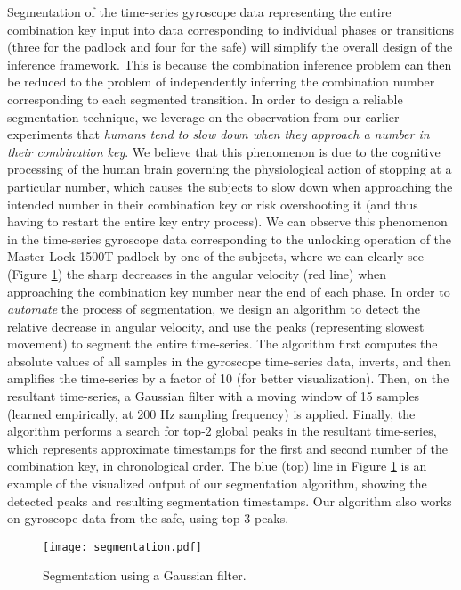 \documentclass[]{IEEEtran}
\begin{document}
Segmentation of the time-series gyroscope data representing the entire combination key input into data corresponding to individual phases or transitions (three for the padlock and four for the safe) will simplify the overall design of the inference framework. This is because the combination inference problem can then be reduced to the problem of independently inferring the combination number corresponding to each segmented transition. In order to design a reliable segmentation technique, we leverage on the observation from our earlier experiments that \textit{humans tend to slow down when they approach a number in their combination key}. We believe that this phenomenon is due to the cognitive processing of the human brain governing the physiological action of stopping at a particular number, which causes the subjects to slow down when approaching the intended number in their combination key or risk overshooting it (and thus having to restart the entire key entry process). We can observe this phenomenon in the time-series gyroscope data corresponding to the unlocking operation of the Master Lock 1500T padlock by one of the subjects, where we can clearly see (Figure \ref{splitting}) the sharp decreases in the angular velocity (red line) when approaching the combination key number near the end of each phase.
In order to \emph{automate} the process of segmentation, we design an algorithm to detect the relative decrease in angular velocity, and use the peaks (representing slowest movement) to segment the entire time-series. The algorithm first computes the absolute values of all samples in the gyroscope time-series data, inverts, and then amplifies the time-series by a factor of 10 (for better visualization). Then, on the resultant time-series, a Gaussian filter with a moving window \cite{deisenroth2011general} of 15 samples (learned empirically, at 200 Hz sampling frequency) is applied. Finally, the algorithm  performs a search for top-$2$ global peaks in the resultant time-series, which represents approximate timestamps for the first and second number of the combination key, in chronological order. The blue (top) line in Figure \ref{splitting} is an example of the visualized output of our segmentation algorithm, showing the detected peaks and resulting segmentation timestamps. Our algorithm also works on gyroscope data from the safe, using top-$3$ peaks.

\begin{figure}[t]
\centering
\texttt{[image: segmentation.pdf]}
\caption{Segmentation using a Gaussian filter.}
\label{splitting}
\end{figure}
\end{document}
